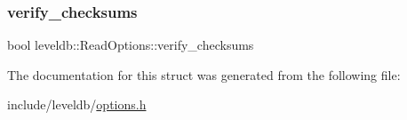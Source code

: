 \mbox{\label{structleveldb_1_1_read_options_a43731d67b707995e20571ad33c1f53f2}} 
\subsubsection{\texorpdfstring{verify\_checksums}{verify\_checksums}}
{\footnotesize\ttfamily bool leveldb\+::\+Read\+Options\+::verify\+\_\+checksums}



The documentation for this struct was generated from the following file\+:\begin{DoxyCompactItemize}
\item 
include/leveldb/\mbox{\hyperlink{options_8h}{options.\+h}}\end{DoxyCompactItemize}
